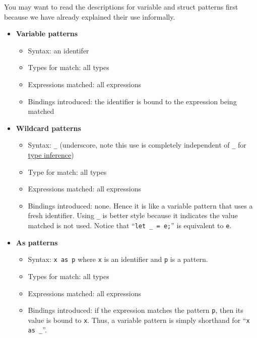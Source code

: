 You may want to read the descriptions for variable and struct patterns
first because we have already explained their use informally.

\begin{itemize}
\item \textbf{Variable patterns}
  \begin{itemize}
  \item Syntax: an identifer
  \item Types for match: all types
  \item Expressions matched: all expressions
  \item Bindings introduced: the identifier is bound to the expression
    being matched
  \end{itemize}
\item \hypertarget{wild_pat}{\textbf{Wildcard patterns}}
  \begin{itemize}
  \item Syntax: \texttt{_} (underscore, note this use is completely
    independent of \texttt{_} for \hyperref[{sec:typeinference}]{type inference})
  \item Type for match: all types
  \item Expressions matched: all expressions
  \item Bindings introduced: none.  Hence it is like a
      variable pattern that uses a fresh identifier.  Using \texttt{_}
      is better style because it indicates the value matched is not
      used.  Notice that ``\texttt{let _ = e;}'' is equivalent to
      \texttt{e}.
  \end{itemize}
  
\item \textbf{As patterns}
  \begin{itemize}
  \item Syntax: \texttt{x as p} where \texttt{x}
    is an identifier and \texttt{p} is a pattern.
  \item Types for match: all types
  \item Expressions matched: all expressions
  \item Bindings introduced: if the expression matches the pattern \texttt{p},
  then its value is bound to \texttt{x}.  Thus, a variable pattern is 
    simply shorthand for ``\texttt{x as _}''.
  \end{itemize}


\end{itemize}
